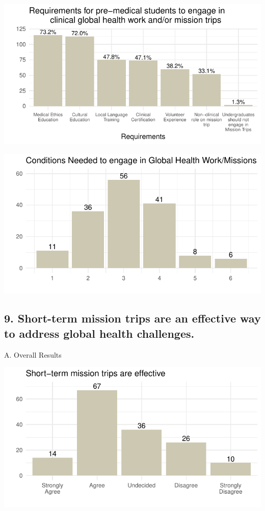 \documentclass[
  letterpaper,
  DIV=11,
  numbers=noendperiod]{scrartcl}
\begin{document}
\includegraphics{GlobalHealthQuarto6-10_files/figure-pdf/unnamed-chunk-9-1.pdf}

\includegraphics{GlobalHealthQuarto6-10_files/figure-pdf/unnamed-chunk-10-1.pdf}

\newpage

\hypertarget{short-term-mission-trips-are-an-effective-way-to-address-global-health-challenges.}{%
\subsection{9. Short-term mission trips are an effective way to address
global health
challenges.}\label{short-term-mission-trips-are-an-effective-way-to-address-global-health-challenges.}}

A. Overall Results

\includegraphics{GlobalHealthQuarto6-10_files/figure-pdf/unnamed-chunk-11-1.pdf}
\end{document}
